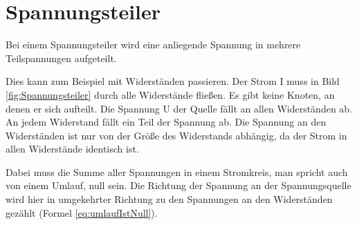 \section{Spannungsteiler}

Bei einem Spannungsteiler wird eine anliegende Spannung in mehrere Teilspannungen aufgeteilt.

Dies kann zum Beispiel mit Widerständen passieren. Der Strom I muss in Bild \ref{fig:Spannungsteiler} durch alle Widerstände fließen. Es gibt keine Knoten, an denen er sich aufteilt. Die Spannung U der Quelle fällt an allen Widerständen ab. An jedem Widerstand fällt ein Teil der Spannung ab. Die Spannung an den Widerständen ist nur von der Größe des Widerstands abhängig, da der Strom in allen Widerstände identisch ist.

Dabei muss die Summe aller Spannungen in einem Stromkreis, man spricht auch von einem Umlauf, null sein. Die Richtung der Spannung an der Spannungsquelle wird hier in umgekehrter Richtung zu den Spannungen an den Widerständen gezählt (Formel \ref{eq:umlaufIstNull}).

